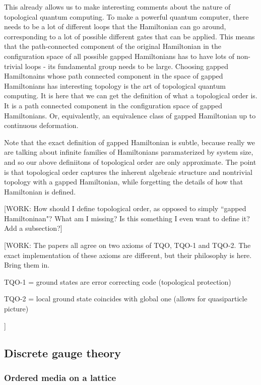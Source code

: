 This already allows us to make interesting comments about the nature of topological quantum computing. To make a powerful quantum computer, there needs to be a lot of different loops that the Hamiltonian can go around, corresponding to a lot of possible different gates that can be applied. This means that the path-connected component of the original Hamiltonian in the configuration space of all possible gapped Hamiltonians has to have lots of non-trivial loops - its fundamental group needs to be large. Choosing gapped Hamiltonains whose path connected component in the space of gapped Hamiltonians has interesting topology is the art of topological quantum computing. It is here that we can get the definition of what a topological order is. It is a path connected component in the configuration space of gapped Hamiltonians. Or, equivalently, an equivalence class of gapped Hamiltonian up to continuous deformation.

Note that the exact definition of gapped Hamiltonian is subtle, because really we are talking about infinite families of Hamiltonians paramaterized by system size, and so our above definiitons of topological order are only approximate. The point is that topological order captures the inherent algebraic structure and nontrivial topology with a gapped Hamiltonian, while forgetting the details of how that Hamiltonian is defined.

[WORK: How should I define topological order, as opposed to simply ``gapped Hamiltoninan"? What am I missing? Is this something I even want to define it? Add a subsection?]

[WORK: The papers \cite{cui2020kitaev, bravyi2010topological,bravyi2011short} all agree on two axioms of TQO, TQO-1 and TQO-2. The exact implementation of these axioms are different, but their philosophy is here. Bring them in.

TQO-1 = ground states are error correcting code (topological protection)

TQO-2 = local ground state coincides with global one (allows for quasiparticle picture)

]

\subsection{Discrete gauge theory}

\subsubsection{Ordered media on a lattice}

